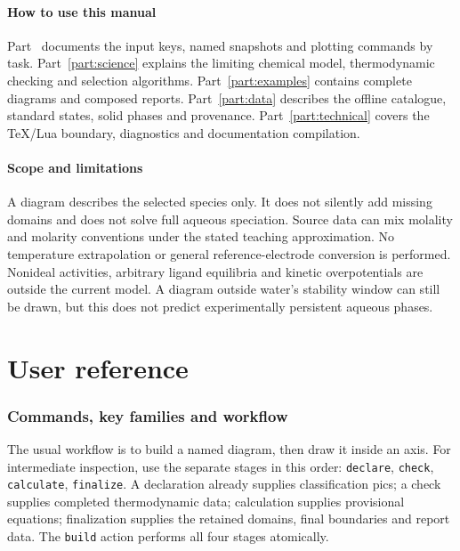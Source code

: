 \documentclass[a4paper,11pt]{ltxdoc}
\begin{document}
\subsection{How to use this manual}
Part~\ref{part:reference} documents the input keys, named snapshots and plotting
commands by task. Part~\ref{part:science} explains the limiting chemical model,
thermodynamic checking and selection algorithms. Part~\ref{part:examples}
contains complete diagrams and composed reports. Part~\ref{part:data} describes
the offline catalogue, standard states, solid phases and provenance.
Part~\ref{part:technical} covers the TeX/Lua boundary, diagnostics and documentation compilation.

\subsection{Scope and limitations}
A diagram describes the selected species only. It does not silently add missing
domains and does not solve full aqueous speciation. Source data can mix molality
and molarity conventions under the stated teaching approximation. No temperature
extrapolation or general reference-electrode conversion is performed. Nonideal
activities, arbitrary ligand equilibria and kinetic overpotentials are outside
the current model. A diagram outside water's stability window can still be drawn,
but this does not predict experimentally persistent aqueous phases.

\clearpage\part{User reference}\label{part:reference}
\section{Commands, key families and workflow}
The usual workflow is to build a named diagram, then draw it inside an axis.
For intermediate inspection, use the separate stages in this order:
\texttt{declare}, \texttt{check}, \texttt{calculate}, \texttt{finalize}.
A declaration already supplies classification pics; a check supplies completed
thermodynamic data; calculation supplies provisional equations; finalization
supplies the retained domains, final boundaries and report data.
The \texttt{build} action performs all four stages atomically.
\end{document}
